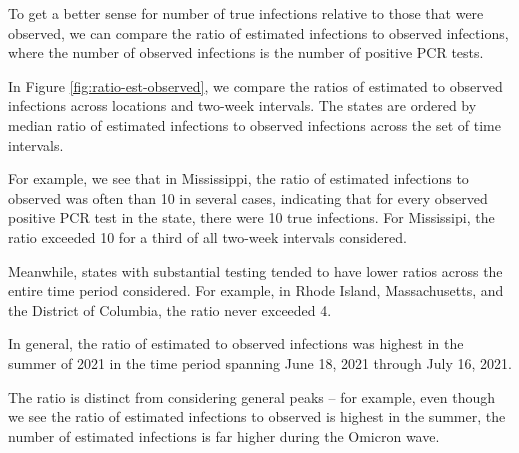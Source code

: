 \documentclass[12pt,twoside]{smiththesis}
\begin{document}
To get a better sense for number of true infections relative to those that were observed, we can compare the ratio of estimated infections to observed infections, where the number of observed infections is the number of positive PCR tests.

In Figure \ref{fig:ratio-est-observed}, we compare the ratios of estimated to observed infections across locations and two-week intervals. The states are ordered by median ratio of estimated infections to observed infections across the set of time intervals.

For example, we see that in Mississippi, the ratio of estimated infections to observed was often than 10 in several cases, indicating that for every observed positive PCR test in the state, there were 10 true infections. For Mississipi, the ratio exceeded 10 for a third of all two-week intervals considered.

Meanwhile, states with substantial testing tended to have lower ratios across the entire time period considered. For example, in Rhode Island, Massachusetts, and the District of Columbia, the ratio never exceeded 4.

In general, the ratio of estimated to observed infections was highest in the summer of 2021 in the time period spanning June 18, 2021 through July 16, 2021.

The ratio is distinct from considering general peaks -- for example, even though we see the ratio of estimated infections to observed is highest in the summer, the number of estimated infections is far higher during the Omicron wave.
\end{document}
